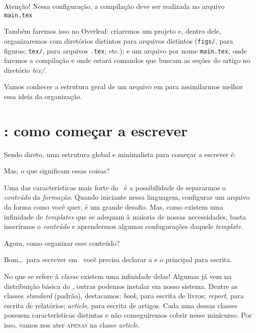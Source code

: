 \begin{atencao}{Atenção!}{\exclamacao}
  \sffamily
  Nessa configuração, a compilação deve ser realizada no arquivo\; \texttt{main.tex}
\end{atencao}

Também faremos isso no \textsf{Overleaf}: criaremos um projeto e, dentro dele, 
organizaremos com diretórios distintos para arquivos distintos (\texttt{figs/}, 
para figuras; \texttt{tex/}, para arquivos \texttt{.tex}; etc.); e um arquivo por 
nome \texttt{main.tex}, onde faremos a compilação e onde estará comandos que 
buscam as seções do artigo no diretório \textit{tex/}.

Vamos conhecer a estrutura geral de um arquivo em {\grega {}} 
para assimilarmos melhor essa ideia da organização. 

\section{{\grega {}}: como começar a escrever} %

Sendo direto, uma estrutura global e minimalista para começar a escrever é:


Mas, o que significam essas coisas?

Uma das características mais forte do \LaTeXX\ é a possibilidade de separarmos 
o \textit{conteúdo} da \textit{formação}. 
Quando iniciante nessa linguagem, configurar um arquivo da forma como você quer, 
é um grande desafio. 
Mas, como existem uma infinidade de \textit{templates} que se adequam à maioria  
de nossas necessidades, basta inserirmos o \textit{conteúdo} e aprendermos algumas 
confugurações daquele \textit{template}. 

Agora, como organizar esse conteúdo? 

Bom\dots\ para escrever em \LaTeXE\ você precisa declarar a  e 
o  principal para escrita. 

No que se refere à \textit{classe} existem uma infinidade delas! 
Algumas já vem na distribuição básica do \LaTeXX, outras podemos instalar em 
nosso sistema. 
Dentre as classes \textit{standard} (padrão), destacamos: \textit{book}, para 
escrita de livros; \textit{report}, para escrita de relatórios; \textit{article}, 
para escrita de artigos. 
Cada uma dessas classes possuem características distintas e não conseguiremos cobrir 
nesse minicurso. 
Por isso, vamos nos ater \textsc{apenas} na classe \textit{article}. 

